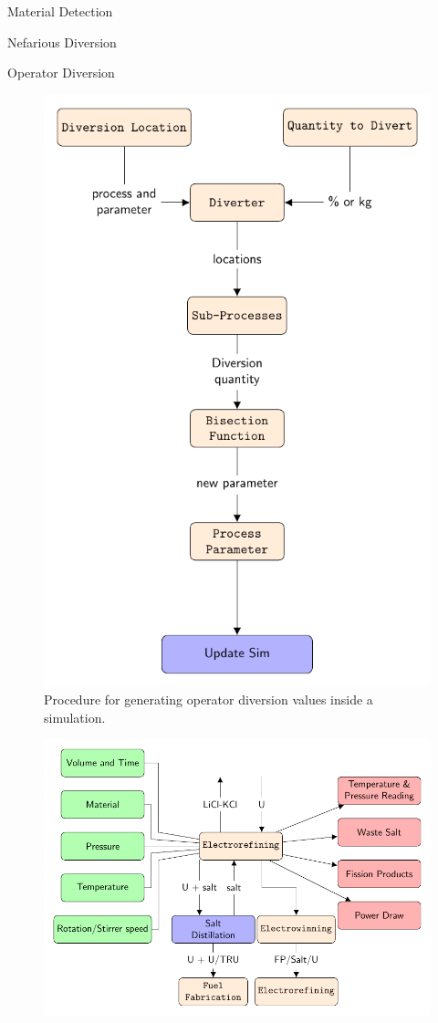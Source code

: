 \documentclass[final]{beamer}
\newlength{\onecolwid}
\newlength{\threecolwid}
\begin{document}
\begin{frame}[t]
\begin{columns}[t,totalwidth=\threecolwid]
\begin{column}{\onecolwid}
\begin{block}{Material Detection}
\begin{block} {Nefarious Diversion}
	\end{block}
	\begin{block} {Operator Diversion}
		\begin{figure}
			\includegraphics[width=0.9\linewidth]{op-diversion}
			\caption{Procedure for generating operator diversion values inside a simulation.}
		\end{figure}
		\begin{figure}
			\includegraphics[width=\linewidth]{refining}

\end{figure}
\end{block}
\end{block}
\end{column}
\end{columns}
\end{frame}
\end{document}
